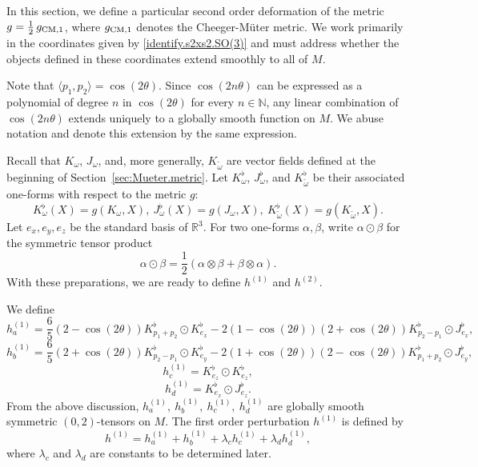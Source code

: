 \documentclass[11pt]{amsart}
\theoremstyle{definition}
\begin{document}
\label{second.order.deformation}

In this section, we define a particular second order deformation of the metric $g = \frac{1}{2} \, g_{\text{\rm CM},1}$, where $g_{\text{\rm CM},1}$ denotes the Cheeger-M\"uter metric. We work primarily in the coordinates given by \eqref{identify.s2xs2.SO(3)} and must address whether the objects defined in these coordinates extend smoothly to all of $M$.

Note that $\langle p_1,p_2\rangle=\cos(2\theta)$.
Since $\cos(2n\theta)$ can be expressed as a polynomial of degree $n$ in $\cos(2\theta)$ for every $n\in\mathbb{N}$, any linear combination of $\cos(2n\theta)$ extends uniquely to a globally smooth function on $M$.
We abuse notation and denote this extension by the same expression.

Recall that $K_\omega$, $J_\omega$, and, more generally, $K_{\tilde{\omega}}$ are vector fields defined at the beginning of Section~\ref{sec:Mueter.metric}.
Let $K^\flat_\omega$, $J^\flat_\omega$, and $K^\flat_{\tilde{\omega}}$ be their associated one-forms with respect to the metric $g$:
\[
K^\flat_\omega(X)=g(K_\omega,X),\ J^\flat_\omega(X)=g(J_\omega,X),\ K^\flat_{\tilde{\omega}}(X)=g(K_{\tilde{\omega}},X).
\]
Let $e_x, e_y, e_z$ be the standard basis of $\mathbb{R}^3$.
For two one-forms $\alpha,\beta$, write $\alpha\odot \beta$ for the symmetric tensor product
\[
\alpha\odot\beta=\frac{1}{2}(\alpha\otimes \beta+\beta\otimes \alpha).
\]
With these preparations, we are ready to define $h^{(1)}$ and $h^{(2)}$.

We define
\[h^{(1)}_a=\frac{6}{5} (2- \cos(2\theta) ) K^\flat_{p_1+p_2}\odot K^\flat_{e_x}-2(1-\cos(2\theta))(2+\cos(2\theta)) K^\flat_{p_2-p_1}\odot J^\flat_{e_x},\] 
\[h^{(1)}_b=\frac{6}{5} (2+\cos(2\theta)) K^\flat_{p_2-p_1}\odot K^\flat_{e_y}-2(1+\cos(2\theta))(2-\cos(2\theta)) K^\flat_{p_1+p_2}\odot J^\flat_{e_y},\]
\[h^{(1)}_c= K^\flat_{e_z}\odot K^\flat_{e_z},\]
\[h^{(1)}_d= K^\flat_{e_x}\odot J^\flat_{e_z}.\]
From the above discussion, $h^{(1)}_a,\ h^{(1)}_b,\ h^{(1)}_c,\ h^{(1)}_d$ are globally smooth symmetric $(0,2)$-tensors on $M$.
The first order perturbation $h^{(1)}$ is defined by
\begin{equation}\label{def.h1}
h^{(1)}=h^{(1)}_a+h^{(1)}_b+\lambda_c h^{(1)}_c+\lambda_d h^{(1)}_d,
\end{equation}
where $\lambda_c$ and $\lambda_d$ are constants to be determined later.
\end{document}

